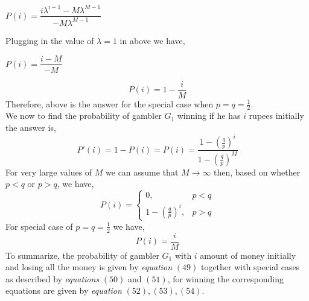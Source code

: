 \documentclass[12pt,a4paper]{article}%
\begin{document}
\begin{flushleft}
 		\begin{center}
 			$P(i)=\dfrac{i\lambda^{i-1}-M\lambda^{M-1}}{-M\lambda^{M-1}}$
 		\end{center}
 		Plugging in the value of $\lambda=1$ in above we have,
 		 \begin{center}
 		 	$P(i)=\dfrac{i-M}{-M}$
 		 \end{center}
 	 	\begin{equation}
 	 		\boxed{P(i)=1-\dfrac{i}{M}}
 	 	\end{equation}
 	 	Therefore, above is the answer for the special case when $p=q=\frac{1}{2}$.\\\smallskip
 	 	We now to find the probability of gambler $G_1$ winning if he has $i$ rupees initially the answer is,
 	 	\begin{equation}
 	 		P'(i)=1-P(i)=\boxed{P(i)=\dfrac{1-(\frac{q}{p})^{i}}{1-(\frac{q}{p})^{M}}}
 	 	\end{equation}
 	 	For very large values of $M$ we can assume that $M \rightarrow \infty$ then, based on whether $p<q$ or $p>q$, we have,
 	 	\begin{equation}
 	 	P(i)=
 	 	\begin{cases}
 	 	0,& p<q\\
 	 	1-(\frac{q}{p})^{i},& p>q
 	 	\end{cases}
 	 	\end{equation}
 	 	For special case of $p=q=\frac{1}{2}$ we have,
 	 	\begin{equation}
 	 	\boxed{P(i)=\dfrac{i}{M}}
 	 	\end{equation}
 	 	To summarize, the probability of gambler $G_1$ with $i$ amount of money initially and losing all the money is given by \textit{equation} $(49)$ together with special cases as described by \textit{equations} $(50)$ and $(51)$, for winning the corresponding equations are given by \textit{equation} $(52), (53), (54)$.
 	 	\pagebreak
 	\end{flushleft}
\end{document}
